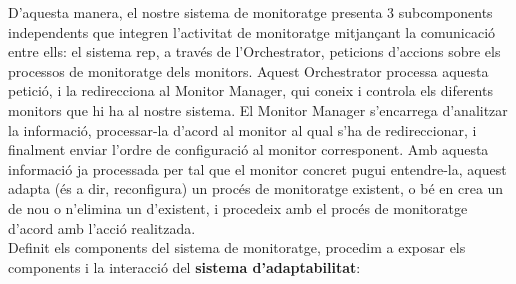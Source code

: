 D'aquesta manera, el nostre sistema de monitoratge presenta 3 subcomponents independents que integren l'activitat de monitoratge mitjançant la comunicació entre ells: el sistema rep, a través de l'Orchestrator, peticions d'accions sobre els processos de monitoratge dels monitors. Aquest Orchestrator processa aquesta petició, i la redirecciona al Monitor Manager, qui coneix i controla els diferents monitors que hi ha al nostre sistema. El Monitor Manager s'encarrega d'analitzar la informació, processar-la d'acord al monitor al qual s'ha de redireccionar, i finalment enviar l'ordre de configuració al monitor corresponent. Amb aquesta informació ja processada per tal que el monitor concret pugui entendre-la, aquest adapta (és a dir, reconfigura) un procés de monitoratge existent, o bé en crea un de nou o n'elimina un d'existent, i procedeix amb el procés de monitoratge d'acord amb l'acció realitzada.\\

Definit els components del sistema de monitoratge, procedim a exposar els components i la interacció del \textbf{sistema d'adaptabilitat}:

